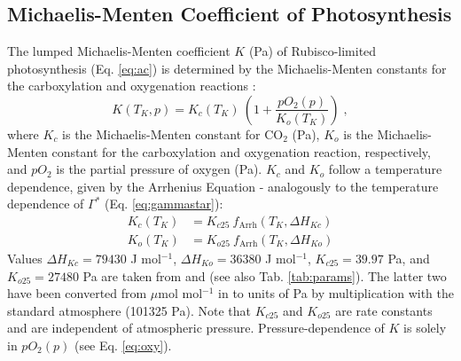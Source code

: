 \documentclass{myreport}
\begin{document}
\subsection{Michaelis-Menten Coefficient of Photosynthesis}
\label{sec:kmm}
The lumped Michaelis-Menten coefficient $K$ (Pa) of Rubisco-limited photosynthesis (Eq. \ref{eq:ac}) is determined by the Michaelis-Menten constants for the carboxylation and oxygenation reactions \citep{farquhar80}:
\begin{equation}
\label{eq:michaelis}
	K(T_K, p) = K_c(T_K)\: \left( 1 + \frac{pO_2(p)}{K_o(T_K)} \right) \;,
\end{equation}
where $K_c$ is the Michaelis-Menten constant for CO$_2$ (Pa), $K_o$ is the Michaelis-Menten constant for the carboxylation and oxygenation reaction, respectively, and $pO_2$ is the partial pressure of oxygen (Pa). $K_c$ and $K_o$ follow a temperature dependence, given by the Arrhenius Equation - analogously to the temperature dependence of $\Gamma^\ast$ (Eq. \ref{eq:gammastar}):
\begin{subequations}
\label{eq:kcko}
\begin{align}
	K_c(T_K)& = K_{c25}\: f_{\text{Arrh}}(T_K, \Delta H_{Kc}) \label{eq:kc} \\
    K_o(T_K)& = K_{o25}\: f_{\text{Arrh}}(T_K, \Delta H_{Ko}) \label{eq:ko}
\end{align}
\end{subequations}
Values $\Delta H_{Kc} = 79430$ J mol$^{-1}$, $\Delta H_{Ko} = 36380$ J mol$^{-1}$, $K_{c25} = 39.97$ Pa, and $K_{o25} = 27480$ Pa are taken from \cite{bernacchi01} and (see also Tab. \ref{tab:params}). The latter two have been converted from $\mu$mol mol$^{-1}$ in \cite{bernacchi01} to units of Pa by multiplication with the standard atmosphere (101325 Pa). Note that $K_{c25}$ and $K_{o25}$ are rate constants and are independent of atmospheric pressure. Pressure-dependence of $K$ is solely in $pO_2(p)$ (see Eq. \ref{eq:oxy}).

\end{document}
